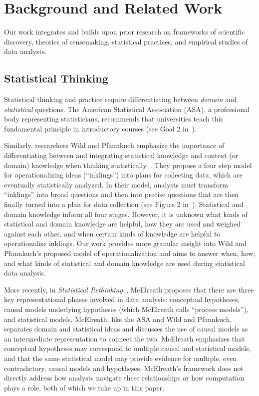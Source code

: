 \section{Background and Related Work}
Our work integrates and builds upon prior research on frameworks of scientific
discovery, theories of sensemaking, statistical practices, and empirical studies
of data analysts.

\subsection{Statistical Thinking} 
Statistical thinking and practice require differentiating between
\textit{domain} and \textit{statistical} questions. The American Statistical
Association (ASA), a professional body representing statisticians, recommends
that universities teach this fundamental principle in introductory courses (see
Goal 2 in~\cite{carver2016guidelines}). 

Similarly, researchers Wild and Pfannkuch emphasize the importance of
differentiating between and integrating statistical knowledge and context (or
domain) knowledge when thinking
statistically~\cite{pfannkuch1997statistical,pfannkuch2000statistical,wild1999statisticalThinking}.
They propose a four step model for operationalizing ideas (``inklings'') into
plans for collecting data, which are eventually statistically analyzed. In their
model, analysts must transform ``inklings'' into broad questions and then into
precise questions that are then finally turned into a plan for data collection
(see Figure 2 in~\cite{wild1999statisticalThinking}). Statistical and domain
knowledge inform all four stages. However, it is unknown what kinds of statistical and domain
knowledge are helpful, how they are used and weighed against each other, and
when certain kinds of knowledge are helpful to operationalize inklings. Our work provides more granular insight into Wild and Pfannkuch's
proposed model of operationalization and aims to answer when, how, and what
kinds of statistical and domain knowledge are used during statistical data
analysis. 

More recently, in \textit{Statistical
Rethinking}~\cite{mcelreath2020statistical}, McElreath proposes that
there are three key representational phases involved in data analysis:
conceptual hypotheses, causal models underlying hypotheses (which McElreath
calls ``process models''), and statistical models. McElreath, like the ASA and
Wild and Pfannkuch, separates domain and statistical ideas and discusses the use
of causal models as an intermediate representation to connect
the two. McElreath emphasizes that conceptual hypotheses may correspond to
multiple causal and statistical models, and that the same statistical
model may provide evidence for multiple, even contradictory, causal models and
hypotheses. McElreath's framework does not directly address how analysts navigate
these relationships or how computation plays a role, both of which we take up in
this paper. 

